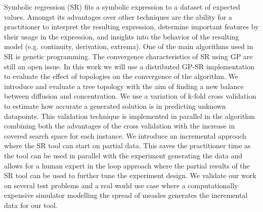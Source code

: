 Symbolic regression (SR) fits a symbolic expression to a dataset of expected values.
Amongst its advantages over other techniques are the ability for a practitioner to interpret the resulting expression, determine important features by their usage in the expression, and insights into the behavior of the resulting model (e.g. continuity, derivation, extrema). One of the main algorithms used in SR is genetic programming. The convergence characteristics of SR using GP are still an open issue.
In this work we will use a distributed GP-SR implementation to evaluate the effect of topologies on the convergence of the algorithm.
We introduce and evaluate a tree topology with the aim of finding a new balance between diffusion and concentration.
We use a variation of k-fold cross validation to estimate how accurate a generated solution is in predicting unknown datapoints. This validation technique is implemented in parallel in the algorithm combining both the advantages of the cross validation with the increase in covered search space for each instance. We introduce an incremental approach where the SR tool can start on partial data. This saves the practitioner time as the tool can be used in parallel with the experiment generating the data and allows for a human expert in the loop approach where the partial results of the SR tool can be used to further tune the experiment design. We validate our work on several test problems and a real world use case where a computationally expensive simulator modelling the spread of measles generates the incremental data for our tool.